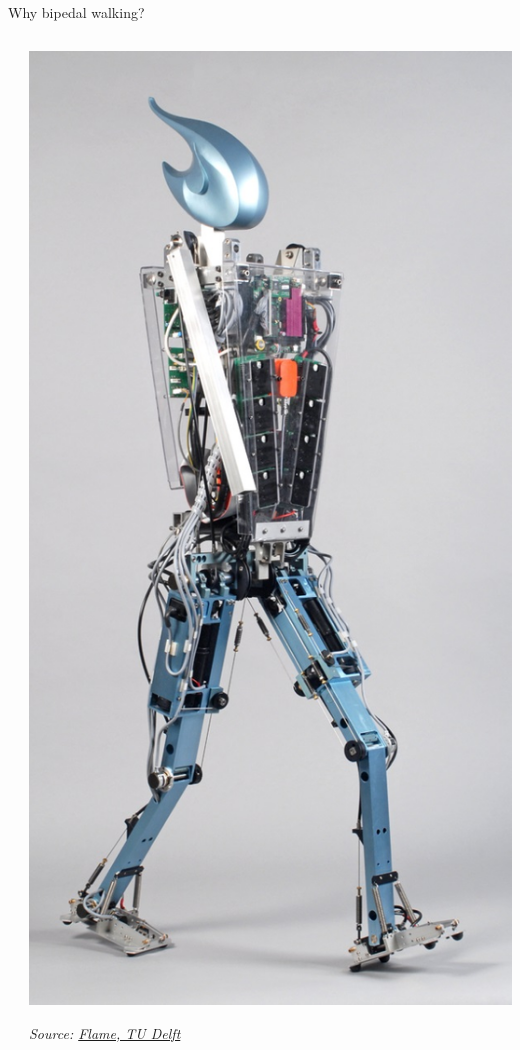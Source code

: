 \documentclass[compress]{beamer}
\newcommand{\source}[2]{{\tiny\it Source: \href{#1}{#2}}}
\begin{document}
\begin{frame}{Why bipedal walking?}
\begin{columns}
\begin{column}{0.5\linewidth}
        \end{column}
        \begin{column}{0.5\linewidth}
            \begin{center}
                \includegraphics[width=0.8\linewidth]{flame}
    
                \source{http://www.3me.tudelft.nl/en/about-the-faculty/departments/biomechanical-engineering/research/dbl-delft-biorobotics-lab/bipedal-robots/}{Flame, TU Delft}
            \end{center}
        \end{column}
    \end{columns}


\end{frame}
\end{document}

